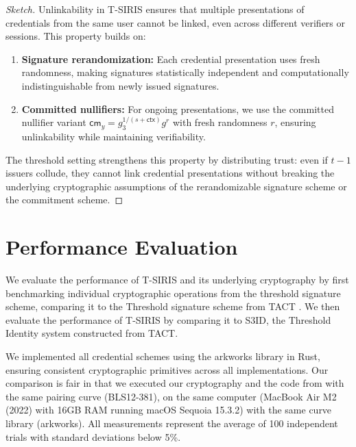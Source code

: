 \begin{proof}[Sketch]
Unlinkability in T-SIRIS ensures that multiple presentations of credentials from the same user cannot be linked, even across different verifiers or sessions. This property builds on:

\begin{enumerate}
    \item \textbf{Signature rerandomization:} Each credential presentation uses fresh randomness, making signatures statistically independent and computationally indistinguishable from newly issued signatures.
    
    \item \textbf{Committed nullifiers:} For ongoing presentations, we use the committed nullifier variant $\mathsf{cm}_y = g_3^{1/(s + \mathsf{ctx})} g^r$ with fresh randomness $r$, ensuring unlinkability while maintaining verifiability.
\end{enumerate}

The threshold setting strengthens this property by distributing trust: even if $t-1$ issuers collude, they cannot link credential presentations without breaking the underlying cryptographic assumptions of the rerandomizable signature scheme or the commitment scheme.
\end{proof}















\newpage
\section{Performance Evaluation}

We evaluate the performance of T-SIRIS and its underlying cryptography by first benchmarking individual cryptographic operations from the threshold signature scheme, comparing it to the Threshold signature scheme from TACT \cite{rabaninejad_attribute-based_2024}. We then evaluate the performance of T-SIRIS by comparing it to S3ID, the Threshold Identity system constructed from TACT.


We implemented all credential schemes using the arkworks library \cite{arkworks_contributors_arkworks_2022} in Rust, ensuring consistent cryptographic primitives across all implementations. Our comparison is fair in that we executed our cryptography \cite{polgar_anonymous_2025} and the code from \cite{arkworks_contributors_arkworks_2022} with the same pairing curve (BLS12-381), on the same computer (MacBook Air M2 (2022) with 16GB RAM running macOS Sequoia 15.3.2) with the same curve library (arkworks). All measurements represent the average of 100 independent trials with standard deviations below 5\%. 

